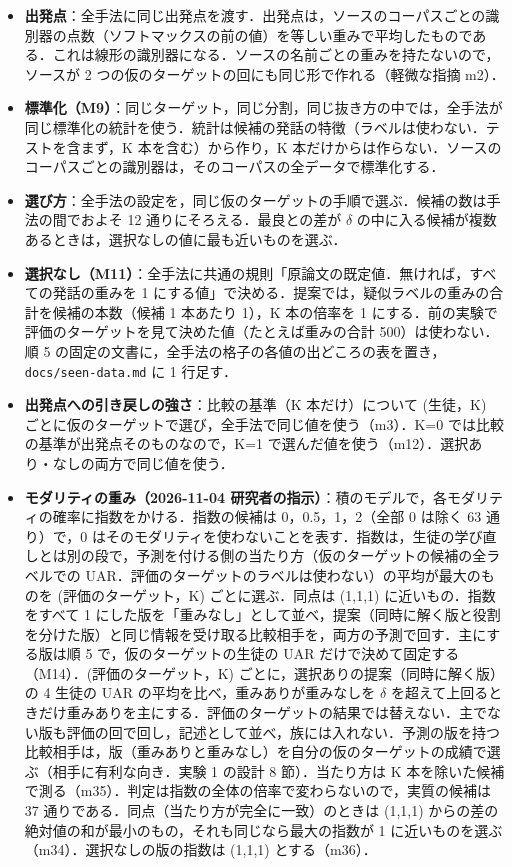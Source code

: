 \documentclass[11pt,a4paper]{ltjsarticle}
\begin{document}
\begin{itemize}
  \item \textbf{出発点}：全手法に同じ出発点を渡す．出発点は，ソースのコーパスごとの識別器の点数（ソフトマックスの前の値）を等しい重みで平均したものである．これは線形の識別器になる．ソースの名前ごとの重みを持たないので，ソースが 2 つの仮のターゲットの回にも同じ形で作れる（軽微な指摘 m2）．
  \item \textbf{標準化（M9）}：同じターゲット，同じ分割，同じ抜き方の中では，全手法が同じ標準化の統計を使う．統計は候補の発話の特徴（ラベルは使わない．テストを含まず，K 本を含む）から作り，K 本だけからは作らない．ソースのコーパスごとの識別器は，そのコーパスの全データで標準化する．
  \item \textbf{選び方}：全手法の設定を，同じ仮のターゲットの手順で選ぶ．候補の数は手法の間でおよそ 12 通りにそろえる．最良との差が $\delta$ の中に入る候補が複数あるときは，選択なしの値に最も近いものを選ぶ．
  \item \textbf{選択なし（M11）}：全手法に共通の規則「原論文の既定値．無ければ，すべての発話の重みを 1 にする値」で決める．提案では，疑似ラベルの重みの合計を候補の本数（候補 1 本あたり 1），K 本の倍率を 1 にする．前の実験で評価のターゲットを見て決めた値（たとえば重みの合計 500）は使わない．順 5 の固定の文書に，全手法の格子の各値の出どころの表を置き，\texttt{docs/seen-data.md} に 1 行足す．
  \item \textbf{出発点への引き戻しの強さ}：比較の基準（K 本だけ）について (生徒，K) ごとに仮のターゲットで選び，全手法で同じ値を使う（m3）．K=0 では比較の基準が出発点そのものなので，K=1 で選んだ値を使う（m12）．選択あり・なしの両方で同じ値を使う．
  \item \textbf{モダリティの重み（2026-11-04 研究者の指示）}：積のモデルで，各モダリティの確率に指数をかける．指数の候補は 0，0.5，1，2（全部 0 は除く 63 通り）で，0 はそのモダリティを使わないことを表す．指数は，生徒の学び直しとは別の段で，予測を付ける側の当たり方（仮のターゲットの候補の全ラベルでの UAR．評価のターゲットのラベルは使わない）の平均が最大のものを (評価のターゲット，K) ごとに選ぶ．同点は (1,1,1) に近いもの．指数をすべて 1 にした版を「重みなし」として並べ，提案（同時に解く版と役割を分けた版）と同じ情報を受け取る比較相手を，両方の予測で回す．主にする版は順 5 で，仮のターゲットの生徒の UAR だけで決めて固定する（M14）．(評価のターゲット，K) ごとに，選択ありの提案（同時に解く版）の 4 生徒の UAR の平均を比べ，重みありが重みなしを $\delta$ を超えて上回るときだけ重みありを主にする．評価のターゲットの結果では替えない．主でない版も評価の回で回し，記述として並べ，族には入れない．予測の版を持つ比較相手は，版（重みありと重みなし）を自分の仮のターゲットの成績で選ぶ（相手に有利な向き．実験 1 の設計 8 節）．当たり方は K 本を除いた候補で測る（m35）．判定は指数の全体の倍率で変わらないので，実質の候補は 37 通りである．同点（当たり方が完全に一致）のときは (1,1,1) からの差の絶対値の和が最小のもの，それも同じなら最大の指数が 1 に近いものを選ぶ（m34）．選択なしの版の指数は (1,1,1) とする（m36）．

\end{itemize}
\end{document}
